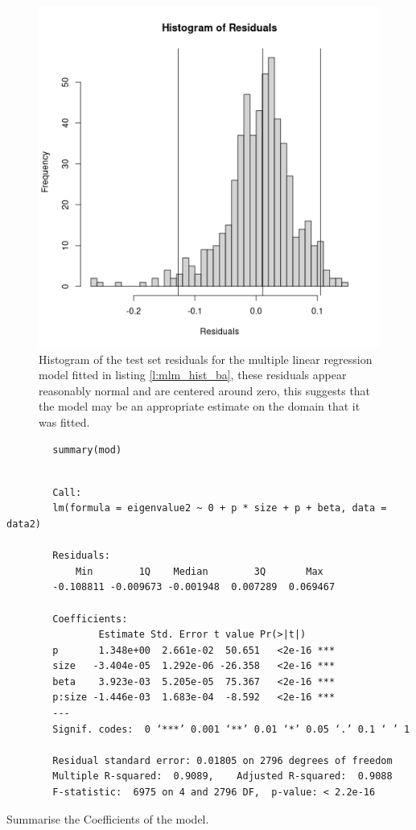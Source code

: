 \documentclass[11pt, twoside]{report}
\begin{document}
\begin{figure}[htbp]
\centering
\includegraphics[width=12cm]{media/ba_hist_mlm_mod.png}
\caption{\label{fig:mlm_hist_ba}Histogram of the test set residuals for the multiple linear regression model fitted in listing \ref{l:mlm_hist_ba}, these residuals appear reasonably normal and are centered around zero, this suggests that the model may be an appropriate estimate on the domain that it was fitted.}
\end{figure}


\begin{listing}[htbp]
    \begin{tcolorbox}
        \begin{verbatim}
        summary(mod)
        \end{verbatim}
    \tcblower
        \begin{verbatim}

        Call:
        lm(formula = eigenvalue2 ~ 0 + p * size + p + beta, data = data2)

        Residuals:
            Min        1Q    Median        3Q       Max
        -0.108811 -0.009673 -0.001948  0.007289  0.069467

        Coefficients:
                Estimate Std. Error t value Pr(>|t|)
        p       1.348e+00  2.661e-02  50.651   <2e-16 ***
        size   -3.404e-05  1.292e-06 -26.358   <2e-16 ***
        beta    3.923e-03  5.205e-05  75.367   <2e-16 ***
        p:size -1.446e-03  1.683e-04  -8.592   <2e-16 ***
        ---
        Signif. codes:  0 ‘***’ 0.001 ‘**’ 0.01 ‘*’ 0.05 ‘.’ 0.1 ‘ ’ 1

        Residual standard error: 0.01805 on 2796 degrees of freedom
        Multiple R-squared:  0.9089,	Adjusted R-squared:  0.9088
        F-statistic:  6975 on 4 and 2796 DF,  p-value: < 2.2e-16
        \end{verbatim}
    \end{tcolorbox}
\caption{\label{mod_summary}Summarise the Coefficients of the model.}
\end{listing}
\end{document}
